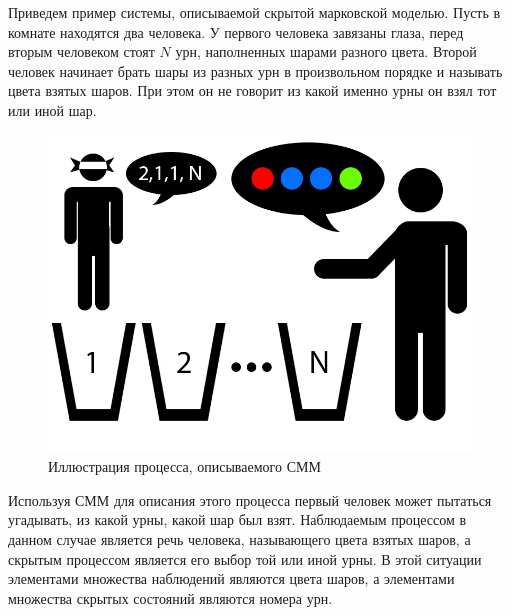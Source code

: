 Приведем пример системы, описываемой скрытой марковской моделью. Пусть в комнате находятся два человека. У первого человека завязаны глаза, перед вторым человеком стоят \(N\) урн, наполненных шарами разного цвета. Второй человек начинает брать шары из разных урн в произвольном порядке и называть цвета взятых шаров. При этом он не говорит из какой именно урны он взял тот или иной шар. 
\begin{figure}[H]
	\centering
	\includegraphics[scale=0.7]{img/hmm.jpg}
	\caption{Иллюстрация процесса, описываемого СММ}
\end{figure}
Используя СММ для описания этого процесса первый человек может пытаться угадывать, из какой урны, какой шар был взят. Наблюдаемым процессом в данном случае является речь человека, называющего цвета взятых шаров, а скрытым процессом является его выбор той или иной урны. В этой ситуации элементами множества наблюдений являются цвета шаров, а элементами множества скрытых состояний являются номера урн.

